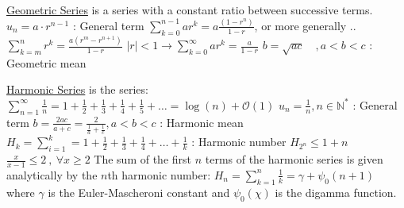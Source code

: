 \documentclass[12pt]{article}
\begin{document}
\begin{flushleft}
	\textbullet \quad \uline{Geometric Series} is a series with a constant ratio between successive terms. \linebreak 
	\textbullet \quad $u_n = a\cdot r^{n-1} $  :  General term \linebreak 
	\textbullet \quad $\displaystyle \sum \limits_{k=0}^{n-1} ar^k = a\frac{(1-r^n)}{1-r}$, or more generally .. \linebreak 
	\textbullet \quad $\displaystyle \sum \limits_{k=m}^n r^k = \frac{a(r^m-r^{n+1})}{1-r} $ \linebreak 
	\textbullet \quad $\displaystyle |r| < 1 \longrightarrow \sum \limits_{k=0}^\infty ar^k = \frac{a}{1-r} $ \linebreak 
	\textbullet \quad $ b=\sqrt{ac} \quad, a<b<c$  :  Geometric mean \linebreak 
	
	\textbullet \quad \uline{Harmonic Series} is the series: $\displaystyle  \sum \limits_{n=1}^{\infty} \frac{1}{n} = 1 + \frac{1}{2} + \frac{1}{3} + \frac{1}{4} + \frac{1}{5} + \ldots = \log (n) + \mathcal{O}(1) $ \linebreak 
	\textbullet \quad $\displaystyle u_n = \frac{1}{n} , n\in \mathbb{N}^* $  :  General term \linebreak 
	\textbullet \quad $\displaystyle b=\frac{2ac}{a+c} = \frac{2}{\frac{1}{a} + \frac{1}{c}}, a< b<c $  :  Harmonic mean \linebreak 
	\textbullet \quad $ H_k = \sum\limits_{i=1}^k = 1 + \frac{1}{2} + \frac{1}{3} + \frac{1}{4} + \ldots + \frac{1}{k} $  :  Harmonic number \linebreak 
	\textbullet \quad $ H_{2^n} \leq 1 + n $ \linebreak 
	\textbullet \quad $ \frac{x}{x - 1} \leq 2 \ , \ \forall x \geq 2 $ \linebreak 
	\textbullet \quad The sum of the first $n$ terms of the harmonic series is given analytically by the $n$th harmonic number: \linebreak 
	$\displaystyle H_n = \sum \limits_{k=1}^n \frac{1}{k} = \gamma + \psi_0 (n+1) $ \linebreak 
	where $\gamma$ is the Euler-Mascheroni constant and $\psi_0(\chi)$ is the digamma function. \linebreak 
	

\end{flushleft}
\end{document}
